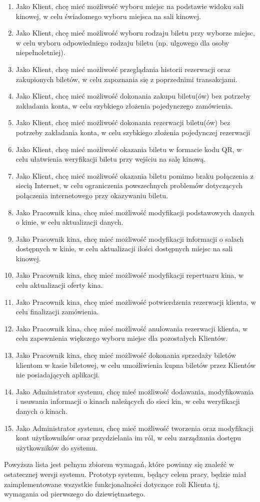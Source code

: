 \begin{enumerate}
\item Jako Klient, chcę mieć możliwość wyboru miejsc na podstawie widoku sali kinowej, w celu świadomego wyboru miejsca na sali kinowej.
\item Jako Klient, chcę mieć możliwość wyboru rodzaju biletu przy wyborze miejsc, w celu wyboru odpowiedniego rodzaju biletu (np. ulgowego dla osoby niepełnoletniej).
\item Jako Klient, chcę mieć możliwość przeglądania historii rezerwacji oraz zakupionych biletów, w celu   zapoznania się z poprzednimi transakcjami.
\item Jako Klient, chcę mieć możliwość dokonania zakupu biletu(ów) bez potrzeby zakładania konta, w celu szybkiego złożenia pojedynczego zamówienia.
\item Jako Klient, chcę mieć możliwość dokonania rezerwacji biletu(ów) bez potrzeby zakładania konta, w celu szybkiego złożenia pojedynczej rezerwacji
\item Jako Klient, chcę mieć możliwość okazania biletu w formacie kodu QR, w celu ułatwienia weryfikacji biletu przy wejściu na salę kinową.
\item Jako Klient, chcę mieć możliwość okazania biletu pomimo braku połączenia z siecią Internet, w celu ograniczenia powszechnych problemów dotyczących połączenia internetowego przy okazywaniu biletu.\newline
\item Jako Pracownik kina, chcę mieć możliwość modyfikacji podstawowych danych o kinie, w celu aktualizacji danych.
\item Jako Pracownik kina, chcę mieć możliwość modyfikacji informacji o salach dostępnych w kinie, w celu aktualizacji ilości dostępnych miejsc na sali kinowej.
\item Jako Pracownik kina, chcę mieć możliwość modyfikacji repertuaru kina, w celu aktualizacji oferty kina.
\item Jako Pracownik kina, chcę mieć możliwość potwierdzenia rezerwacji klienta, w celu finalizacji zamówienia.
\item Jako Pracownik kina, chcę mieć możliwość anulowania rezerwacji klienta, w celu zapewnienia większego wyboru miejsc dla pozostałych Klientów.
\item Jako Pracownik kina, chcę mieć możliwość dokonania sprzedaży biletów klientom w kasie biletowej, w celu umożliwienia kupna biletów przez Klientów nie posiadających aplikacji.
\item Jako Administrator systemu, chcę mieć możliwość dodawania, modyfikowania i usuwania informacji o kinach należących do sieci kin, w celu weryfikacji danych o kinach.
\item Jako Administrator systemu, chcę mieć możliwość tworzenia oraz modyfikacji kont użytkowników oraz przydzielania im ról, w celu zarządzania dostępu użytkowników do systemu.
\end{enumerate}
Powyższa lista jest pełnym zbiorem wymagań, które powinny się znaleźć w ostatecznej wersji systemu. Prototyp systemu, będący celem pracy, będzie miał zaimplementowane wszystkie funkcjonalności dotyczące roli Klienta tj. wymagania od pierwszego do dziewiętnastego.

